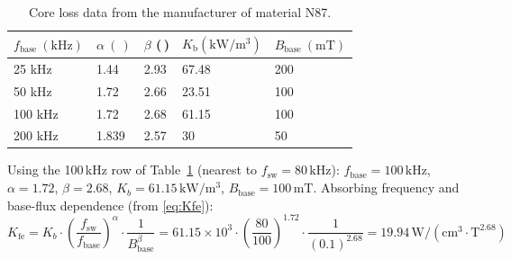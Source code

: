 \documentclass{PELsmallreport}
\begin{document}
\begin{table}[!h]
    \centering
    \caption{Core loss data from the manufacturer of material N87. }
    \label{tab:core_loss_data}
    \begin{tabular}{|l|l|l|l|l|}
    \hline
    $f_\mathrm{base} \: (\mathrm{kHz})  $ & $\alpha \: (\,) $ & $\beta$  \: (\,) & $K_\mathrm{b} (\mathrm{kW}/\mathrm{m^3})$ & $B_\mathrm{base} \: (\mathrm{mT}) $  \\
    \hline
    25 kHz            & 1.44    & 2.93  & 67.48 &  200              \\
    \hline
    50 kHz            & 1.72    & 2.66  & 23.51 &  100              \\
    \hline
    100 kHz           & 1.72    & 2.68  & 61.15 &  100              \\
    \hline
    200 kHz           & 1.839   & 2.57  & 30 &  50               \\            
    \hline
    \end{tabular}
\end{table}




\begin{framed}
Using the 100\,kHz row of Table~\ref{tab:core_loss_data} (nearest to $f_\mathrm{sw}=80\,\mathrm{kHz}$): $f_\mathrm{base}=100\,\mathrm{kHz}$, $\alpha=1.72$, $\beta=2.68$, $K_b=61.15\,\mathrm{kW/m^3}$, $B_\mathrm{base}=100\,\mathrm{mT}$. Absorbing frequency and base-flux dependence (from \eqref{eq:Kfe}):
\begin{equation}
    K_\mathrm{fe} = K_b \cdot \!\left(\frac{f_\mathrm{sw}}{f_\mathrm{base}}\right)^{\!\alpha} \cdot \frac{1}{B_\mathrm{base}^{\beta}} = 61.15\!\times\!10^3 \cdot \!\left(\frac{80}{100}\right)^{\!1.72} \cdot \frac{1}{(0.1)^{2.68}} = 19.94\,\mathrm{W/(cm^3 \cdot T^{2.68})}
\end{equation}
\end{framed}

 \hfill{}

\end{document}
